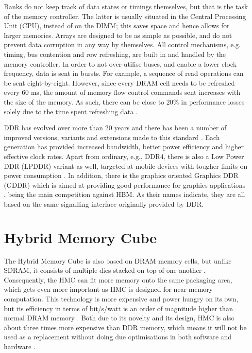 Banks do not keep track of data states or timings themselves, but that is the task of the memory controller. The latter is usually situated in the Central Processing Unit (CPU), instead of on the DIMM; this saves space and hence allows for larger memories. Arrays are designed to be as simple as possible, and do not prevent data corruption in any way by themselves. All control mechanisms, e.g. timing, bus contention and row refreshing, are built in and handled by the memory controller. In order to not over-utilise buses, and enable a lower clock frequency, data is sent in bursts. For example, a sequence of read operations can be sent eight-by-eight. However, since every DRAM cell needs to be refreshed every 60 ms, the amount of memory flow control commands sent increases with the size of the memory. As such, there can be close to 20\% in performance losses solely due to the time spent refreshing data \cite{6835946}.
\bigskip

DDR has evolved over more than 20 years and there has been a number of improved versions, variants and extensions made to this standard \cite{standard2012ddr4}. Each generation has provided increased bandwidth, better power efficiency and higher effective clock rates. Apart from ordinary, e.g., DDR4, there is also a Low Power DDR (LPDDR) variant as well, targeted at mobile devices with tougher limits on power consumption \cite{jedec2014low}. In addition, there is the graphics oriented Graphics DDR (GDDR) which is aimed at providing good performance for graphics applications \cite{jesd2502017graphics}, being the main competition against HBM. As their names indicate, they are all based on the same signalling interface originally provided by DDR.


\section{Hybrid Memory Cube}
The Hybrid Memory Cube is also based on DRAM memory cells, but unlike SDRAM, it consists of multiple dies stacked on top of one another \cite{hybrid2013hybrid}. Consequently, the HMC can fit more memory onto the same packaging area, which gets even more important as HMC is designed for near-memory computation. This technology is more expensive and power hungry on its own, but its efficiency in terms of bit/s/watt is an order of magnitude higher than normal DRAM memory \cite{7477494}. Both due to its novelty and its design, HMC is also about three times more expensive than DDR memory, which means it will not be used as a replacement without doing due optimisations in both software and hardware \cite{Jayaraj:2015:PPM:2818950.2818976}.


